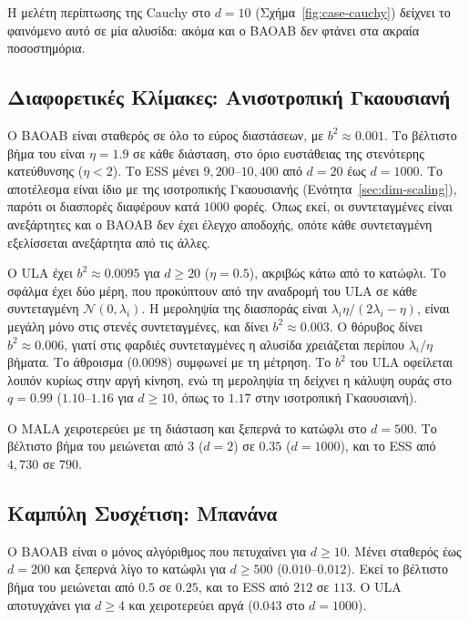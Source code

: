 Η μελέτη περίπτωσης της Cauchy στο $d=10$ (Σχήμα~\ref{fig:case-cauchy}) δείχνει το
φαινόμενο αυτό σε μία αλυσίδα: ακόμα και ο BAOAB δεν φτάνει στα ακραία
ποσοστημόρια.


\subsection{Διαφορετικές Κλίμακες: Ανισοτροπική Γκαουσιανή}
\label{sec:geo-anisotropic}

Ο BAOAB είναι σταθερός σε όλο το εύρος διαστάσεων, με $b^2 \approx 0.001$. Το
βέλτιστο βήμα του είναι $\eta = 1.9$ σε κάθε διάσταση, στο όριο ευστάθειας της
στενότερης κατεύθυνσης ($\eta < 2$). Το ESS μένει $9{,}200$--$10{,}400$ από $d=20$ έως
$d=1000$. Το αποτέλεσμα είναι ίδιο με της ισοτροπικής Γκαουσιανής
(Ενότητα~\ref{sec:dim-scaling}), παρότι οι διασπορές διαφέρουν κατά $1000$
φορές. Όπως εκεί, οι συντεταγμένες είναι ανεξάρτητες και ο BAOAB δεν έχει έλεγχο
αποδοχής, οπότε κάθε συντεταγμένη εξελίσσεται ανεξάρτητα από τις άλλες.

Ο ULA έχει $b^2 \approx 0.0095$ για $d \ge 20$ ($\eta = 0.5$), ακριβώς κάτω από το
κατώφλι. Το σφάλμα έχει δύο μέρη, που προκύπτουν από την αναδρομή του ULA σε κάθε
συντεταγμένη $\mathcal{N}(0, \lambda_i)$. Η μεροληψία της διασποράς είναι
$\lambda_i\eta/(2\lambda_i - \eta)$, είναι μεγάλη μόνο στις στενές συντεταγμένες, και
δίνει $b^2 \approx 0.003$. Ο θόρυβος δίνει $b^2 \approx 0.006$, γιατί στις φαρδιές
συντεταγμένες η αλυσίδα χρειάζεται περίπου $\lambda_i/\eta$ βήματα. Το άθροισμα
($0.0098$) συμφωνεί με τη μέτρηση. Το $b^2$ του ULA οφείλεται λοιπόν κυρίως στην αργή
κίνηση, ενώ τη μεροληψία τη δείχνει η κάλυψη ουράς στο $q=0.99$ ($1.10$--$1.16$ για
$d \ge 10$, όπως το $1.17$ στην ισοτροπική Γκαουσιανή).

Ο MALA χειροτερεύει με τη διάσταση και ξεπερνά
το κατώφλι στο $d=500$. Το βέλτιστο βήμα του μειώνεται από $3$ ($d=2$) σε $0.35$
($d=1000$), και το ESS από $4{,}730$ σε $790$.

\subsection{Καμπύλη Συσχέτιση: Μπανάνα}
\label{sec:geo-banana}

Ο BAOAB είναι ο μόνος αλγόριθμος που πετυχαίνει για $d \ge 10$. Μένει σταθερός έως
$d=200$ και ξεπερνά λίγο το κατώφλι για $d \ge 500$ ($0.010$--$0.012$). Εκεί το βέλτιστο
βήμα του μειώνεται από $0.5$ σε $0.25$, και το ESS από $212$ σε $113$. Ο ULA αποτυγχάνει
για $d \ge 4$ και χειροτερεύει αργά ($0.043$ στο $d=1000$).

